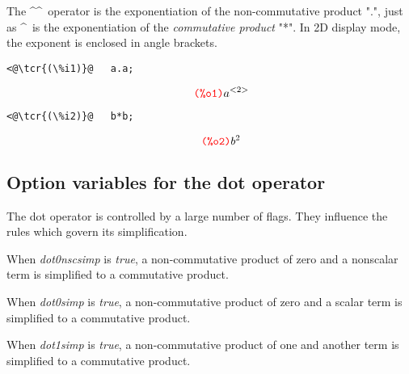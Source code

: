 \documentclass[../Maxima_Workbook.tex]{subfiles}
\begin{document}
\lz {} \hfill {}\index{\textasciicircum\textasciicircum}

\lz The \textasciicircum\textasciicircum \ operator is the exponentiation of the non-commutative product ".", just as \textasciicircum \  is the exponentiation of the \emph{commutative product} "*". In 2D display mode, the exponent is enclosed in angle brackets.

\lz \begin{small}
\color{blue} \leqn
\begin{lstlisting}
<@\tcr{(\%i1)}@   a.a;
\end{lstlisting}
\vspace{-6mm} \[\tag*{\tcr{\ttfamily (\%o1)}} a^{<2>} \]
\vspace{-10mm} 
\begin{lstlisting}
<@\tcr{(\%i2)}@   b*b;
\end{lstlisting}
\vspace{-6mm} \[\tag*{\tcr{\ttfamily (\%o2)}} b^2 \]
\color{black}
\end{small} \leqn
\vspace{-4mm} 

\subsection{Option variables for the dot operator}

The dot operator is controlled by a large number of flags. They influence the rules which govern its simplification.

\lzz {} \qquad {} \hfill {}

\lz When \emph{dot0nscsimp} is \emph{true}, a non-commutative product of zero and a nonscalar term is simplified to a commutative product.

\lzz {} \qquad {} \hfill {}

\lz When \emph{dot0simp} is \emph{true}, a non-commutative product of zero and a scalar term is simplified to a commutative product.

\lzz {} \qquad {} \hfill {}

\lz When \emph{dot1simp} is \emph{true}, a non-commutative product of one and another term is simplified to a commutative product.
\end{document}
